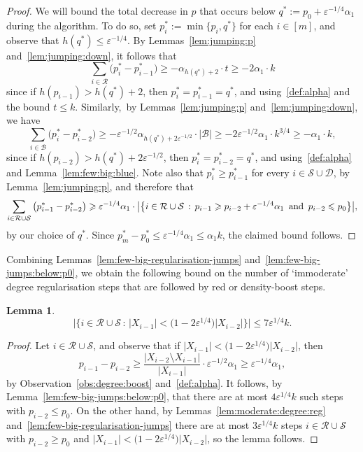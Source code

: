 \documentclass[12pt,reqno]{amsart}
\newtheorem{lemma}[theorem]{Lemma}
\theoremstyle{definition}
\theoremstyle{remark}
\newcommand\cB{\mathcal{B}}
\def\cS{\mathcal{S}}
\newcommand\eps{\varepsilon}
\renewcommand{\le}{\leqslant}
\renewcommand{\ge}{\geqslant}
\def\eps{\varepsilon}
\def\cD{\mathcal{D}}
\def\cR{\mathcal{R}}
\def\cB{\mathcal{B}}
\begin{document}
\begin{proof}
We will bound the total decrease in $p$ that occurs below $q^* := p_0 + \eps^{-1/4} \alpha_1$ during the algorithm. To do so, set $p_i^* := \min\{ p_i,q^*\}$ for each $i \in [m]$, and observe that $h(q^*) \le \eps^{-1/4}$. By Lemmas~\ref{lem:jumping:p} and~\ref{lem:jumping:down}, it follows that 
$$\sum_{i \in \cR} \big( p_i^* - p_{i-1}^* \big) \ge - \alpha_{h(q^*) + 2} \cdot t \ge - 2\alpha_1 \cdot k$$
since if $h(p_{i-1}) > h(q^*) + 2$, then $p_i^* = p_{i-1}^* = q^*$, and using~\eqref{def:alpha} and the bound $t \le k$. Similarly,~by Lemmas~\ref{lem:jumping:p} and~\ref{lem:jumping:down}, we have
$$\sum_{i \in \cB} \big( p_i^* - p_{i-2}^* \big) \ge - \eps^{-1/2} \alpha_{h(q^*) + 2\eps^{-1/2}} \cdot |\cB| \ge - 2\eps^{-1/2} \alpha_1 \cdot k^{3/4} \ge -\alpha_1 \cdot k,$$
since if $h(p_{i-2}) > h(q^*) + 2\eps^{-1/2}$, then $p_i^* = p_{i-2}^* = q^*$, and using~\eqref{def:alpha} and Lemma~\ref{lem:few:big:blue}. Note also that $p_i^* \ge p_{i-1}^*$ for every $i \in \cS \cup \cD$, by Lemma~\ref{lem:jumping:p}, and therefore that
$$\sum_{i \in \cR \cup \cS} \big( p_{i-1}^* - p_{i-2}^* \big) \ge \eps^{-1/4} \alpha_1 \cdot \big|\big\{ i \in \cR \cup \cS \,:\, p_{i-1} \ge p_{i-2} + \eps^{-1/4} \alpha_1 \,\textup{ and }\, p_{i-2} \le p_0 \big\} \big|,$$
by our choice of $q^*$. Since $p_m^* - p_0^* \le \eps^{-1/4} \alpha_1 \le \alpha_1 k$, the claimed bound follows. 
\end{proof}

Combining Lemmas~\ref{lem:few-big-regularisation-jumps} and~\ref{lem:few-big-jumps:below:p0}, we obtain the following bound on the number of `immoderate' degree regularisation steps that are followed by red or density-boost steps. 


\begin{lemma}\label{lem:few:immoderate:degree:reg:steps}
$$\big| \big\{ i \in \cR \cup \cS \,:\, |X_{i-1}| < \big( 1 - 2 \eps^{1/4} \big) |X_{i-2}| \big\} \big| \le 7\eps^{1/4} k.$$
\end{lemma}

\begin{proof}
Let $i \in \cR \cup \cS$, and observe that if $|X_{i-1}| < \big( 1 - 2 \eps^{1/4} \big) |X_{i-2}|$, then
$$p_{i-1} - p_{i-2} \ge \frac{|X_{i-2} \setminus X_{i-1}|}{|X_{i-1}|} \cdot \eps^{-1/2} \alpha_1 \ge \eps^{-1/4} \alpha_1,$$
by Observation~\ref{obs:degree:boost} and~\eqref{def:alpha}. It follows, by Lemma~\ref{lem:few-big-jumps:below:p0}, that there are at most $4 \eps^{1/4} k$ such steps with $p_{i-2} \le p_0$. On the other hand, by Lemmas~\ref{lem:moderate:degree:reg} and~\ref{lem:few-big-regularisation-jumps} there are at most $3 \eps^{1/4} k$ steps $i \in \cR \cup \cS$ with $p_{i-2} \ge p_0$ and $|X_{i-1}| < \big( 1 - 2 \eps^{1/4} \big) |X_{i-2}|$, so the lemma follows.
\end{proof}
\end{document}
